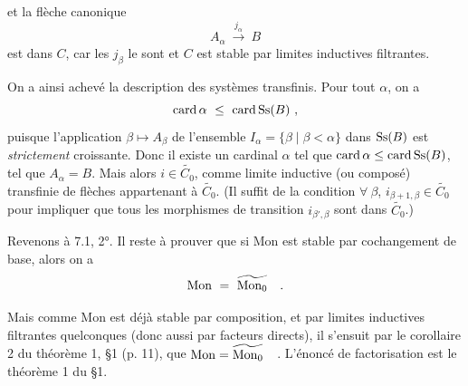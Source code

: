 
et la flèche canonique
\[
A_\alpha \ \xrightarrow{j_\alpha} \ B
\]
est dans $C$, car les $j_\beta$ le sont et $C$ est stable par limites inductives filtrantes.

On a ainsi achevé la description des systèmes transfinis. Pour tout $\alpha$, on a
\[
\card \alpha \ \leq \ \card \Ss(B) \ ,
\]
puisque l'application $\beta \longmapsto A_\beta$ de l'ensemble $I_\alpha = \{\beta \mid \beta < \alpha\}$ dans $\mathrm{Ss}(B)$ est \textit{strictement} croissante. Donc il existe un cardinal $\alpha$ tel que $\operatorname{card} \alpha \leq \operatorname{card} \mathrm{Ss}(B)$, tel que $A_\alpha = B$. Mais alors $i \in \widetilde{C_0}$, comme limite inductive (ou composé) transfinie de flèches appartenant à $\widetilde{C_0}$. (Il suffit de la condition $\forall\ \beta$, $i_{\beta+1,\beta} \in \widetilde{C_0}$ pour impliquer que tous les morphismes de transition $i_{\beta',\beta}$ sont dans $\widetilde{C_0}$.)

Revenons à 7.1, 2°. Il reste à prouver que si Mon est stable par cochangement de base, alors on a
\[
\Mon \ = \ \widetilde{\Mon_0} \quad .
\]

Mais comme Mon est déjà stable par composition, et par limites inductives filtrantes quelconques (donc aussi par facteurs directs), il s'ensuit par le corollaire 2 du théorème 1, §1 (p. 11), que $\mathrm{Mon} = \widetilde{\mathrm{Mon}_0}$\ \ . L'énoncé de factorisation est le théorème 1 du §1.



